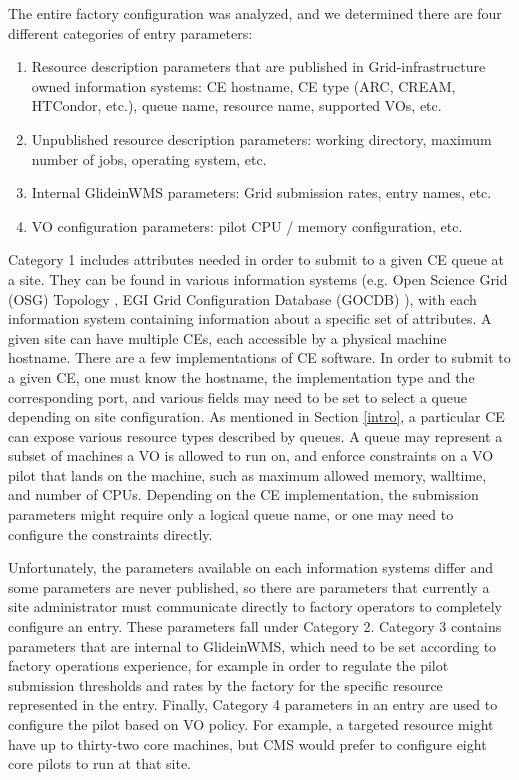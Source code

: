 \documentclass{webofc}
\begin{document}
The entire factory configuration was analyzed, and we determined there are four different categories of entry parameters:
\begin{enumerate}
\item Resource description parameters that are published in Grid-infrastructure owned information systems: CE hostname, CE type (ARC, CREAM, HTCondor, etc.), queue name, resource name, supported VOs, etc.
\item Unpublished resource description parameters: working directory, maximum number of jobs, operating system, etc.
\item Internal GlideinWMS parameters: Grid submission rates, entry names, etc.
\item VO configuration parameters: pilot CPU / memory configuration, etc.
\end{enumerate}


Category 1 includes attributes needed in order to submit to a given CE queue at a site. They can be found in various information systems (e.g. Open Science Grid (OSG) Topology \cite{OSG-Topology}, EGI Grid Configuration Database (GOCDB) \cite{GOCDB}), with each information system containing information about a specific set of attributes. A given site can have multiple CEs, each accessible by a physical machine hostname. There are a few implementations of CE software. In order to submit to a given CE, one must know the hostname, the implementation type and the corresponding port, and various fields may need to be set to select a queue depending on site configuration. As mentioned in Section \ref{intro}, a particular CE can expose various resource types described by queues. A queue may represent a subset of machines a VO is allowed to run on, and enforce constraints on a VO pilot that lands on the machine, such as maximum allowed memory, walltime, and number of CPUs. Depending on the CE implementation, the submission parameters might require only a logical queue name, or one may need to configure the constraints directly.

Unfortunately, the parameters available on each information systems differ and some parameters are never published, so there are parameters that 
currently a site administrator must
communicate directly to factory operators to completely configure an entry. These parameters fall under Category 2. Category 3 contains parameters that are internal to GlideinWMS, which need to be set according to factory operations experience, for example in order to regulate the pilot submission thresholds and rates by the factory for the specific resource represented in the entry. Finally, Category 4 parameters in an entry are used to configure the pilot based on VO policy. For example, a targeted resource might have up to thirty-two core machines, but CMS would prefer to configure eight core pilots to run at that site.
\end{document}
